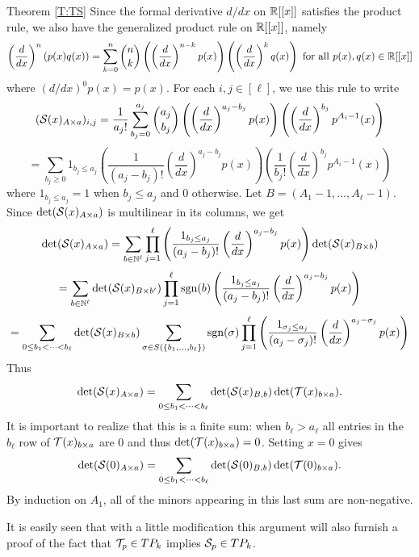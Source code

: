 \documentclass[12pt]{article}
\begin{document}
\begin{proofof}{Theorem \ref{T:TS}}
Since the formal derivative $d/dx$ on $\mathbb{R}[[x]]$ satisfies the product rule, we also have the generalized product rule on $\mathbb{R}[[x]]$, namely \[\left(\frac{d}{dx}\right)^n(p(x)q(x)) = \sum_{k=0}^n \binom{n}{k}\left(\left(\frac{d}{dx}\right)^{n-k} p(x)\right)\left(\left(\frac{d}{dx}\right)^k q(x)\right) \text{ for all $p(x),q(x) \in \mathbb{R}[[x]]$}\] where $(d/dx)^0p(x) = p(x)$.  For each $i,j \in [\ell]$, we use this rule to write
\[({\cal S}(x)_{A \times a})_{i,j} = \frac{1}{a_j!} \sum_{b_j = 0}^{a_j} \binom{a_j}{b_j}\left(\left(\frac{d}{dx}\right)^{a_j-b_j} p(x)\right)\left(\left(\frac{d}{dx}\right)^{b_j} p^{A_i-1}(x)\right)\]
\[= \sum_{b_j \geq 0} 1_{b_j\leq a_j} \left(\frac{1}{(a_j-b_j)!}\left(\frac{d}{dx}\right)^{a_j-b_j} p(x)\right) \left(\frac{1}{b_j!}\left(\frac{d}{dx}\right)^{b_j} p^{A_i-1}(x)\right)\]
where $1_{b_j \leq a_j} = 1$ when $b_j \leq a_j$ and $0$ otherwise.  Let $B = (A_1-1,\ldots,A_\ell-1)$. Since $\det({\cal S}(x)_{A \times a})$ is multilinear in its columns, we get
\[\det({\cal S}(x)_{A \times a}) = \sum_{b \in \mathbb{N}^\ell} \prod_{j=1}^\ell \left (\frac{1_{b_j \leq a_j}}{(a_j - b_j)!} \left(\frac{d}{dx}\right)^{a_j-b_j} p(x)\right) \det({\cal S}(x)_{B \times b})\]
\[ = \sum_{b \in \mathbb{N}^\ell} \det({\cal S}(x)_{B \times b'})\prod_{j=1}^\ell \mbox{sgn}(b) \left(\frac{1_{b_j \leq a_j}}{(a_j - b_j)!}\left(\frac{d}{dx}\right)^{a_j-b_j} p(x)\right)  \]
\[ = \sum_{0 \leq b_1 < \cdots < b_\ell} \det({\cal S}(x)_{B \times b}) \sum_{\sigma \in S(\{b_1, \ldots, b_\ell\})} \mbox{sgn}(\sigma) \prod_{j=1}^\ell \left(\frac{1_{\sigma_j \leq a_j}}{(a_j - \sigma_j)!}\left(\frac{d}{dx}\right)^{a_j-\sigma_j} p(x)\right) \]
Thus \[\det({\cal S}(x)_{A \times a}) = \sum_{0\leq b_1 < \cdots < b_\ell} \det({\cal S}(x)_{B,b}) \det({\cal T}(x)_{b \times a}).\] It is important to realize that this is a finite sum:  when $b_\ell > a_\ell$ all entries in the $b_\ell$ row of ${\cal T}(x)_{b \times a}$ are $0$ and thus $\det({\cal T}(x)_{b \times a})=0$. Setting $x=0$ gives \[\det({\cal S}(0)_{A \times a}) = \sum_{0\leq b_1 < \cdots < b_\ell} \det({\cal S}(0)_{B,b}) \det({\cal T}(0)_{b \times a}).\]  By induction on $A_1$, all of the minors appearing in this last sum are non-negative.

It is easily seen that with a little modification this argument will also furnish a proof of the fact that ${\cal T}_p \in TP_k$ implies ${\cal S}_p \in TP_k$.
\end{proofof}
\end{document}
